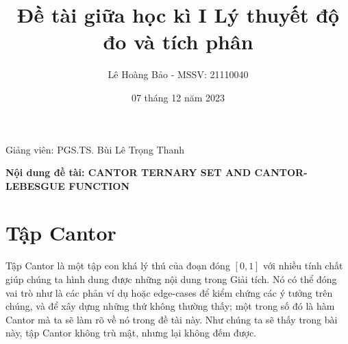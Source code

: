 \documentclass[10.5pt, a4paper]{article}
\title{\color{red}\textbf{Đề tài giữa học kì I Lý thuyết độ đo và tích phân}}
\author{\color{red}Lê Hoàng Bảo - MSSV: 21110040}
\date{\color{red}07 tháng 12 năm 2023}
\begin{document}
\pagestyle{fancy}
\fancyhead{} %
\fancyfoot{} %
\fancyfoot[C]{\textbf\thepage}
\renewcommand{\headrulewidth}{0.7pt}
\renewcommand{\footrulewidth}{0.7pt}
\maketitle
\begin{center}
    Giảng viên: PGS.TS. Bùi Lê Trọng Thanh
\end{center}
\begin{center}
    \textbf{Nội dung đề tài: CANTOR TERNARY SET AND CANTOR-LEBESGUE FUNCTION}
\end{center}
\newpage
\section{Tập Cantor}
\vspace{2mm}
Tập Cantor là một tập con khá lý thú của đoạn đóng $[0,1]$ với nhiều tính chất giúp chúng ta hình dung được những nội dung trong Giải tích. Nó có thể đóng vai trò như là các phản ví dụ hoặc edge-cases để kiểm chứng các ý tưởng trên chúng, và để xây dựng những thứ không thường thấy; một trong số đó là hàm Cantor mà ta sẽ làm rõ về nó trong đề tài này. Như chúng ta sẽ thấy trong bài này, tập Cantor không trù mật, nhưng lại không đếm được.
\end{document}
